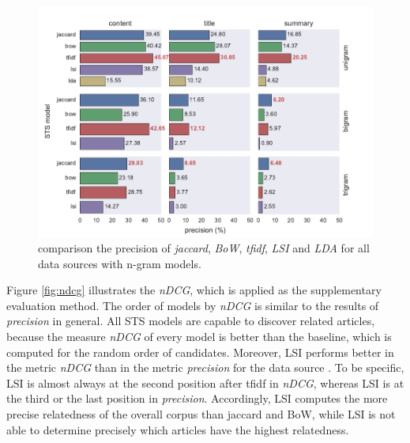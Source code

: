 \begin{figure}[!htb]
    \centering
    \includegraphics[width=\textwidth]{fig/precision_2_3}
    \caption{comparison the precision of \textit{jaccard}, \textit{BoW}, \textit{tfidf}, \textit{LSI} and \textit{LDA} for all data sources  with n-gram models. }
    \label{fig:precision_2_3}
\end{figure}

Figure \ref{fig:ndcg} illustrates the \textit{nDCG}, which is applied as the supplementary evaluation method. The order of models by \textit{nDCG} is similar to the results of \textit{precision} in general. All STS models are capable to discover related articles, because the measure \textit{nDCG} of every model is better than the baseline, which is computed for the random order of candidates. Moreover, LSI performs better in the metric \textit{nDCG} than in the metric \textit{precision} for the data source \icontent{}. To be specific, LSI is almost always at the second position after tfidf in \textit{nDCG}, whereas LSI is at the third or the last position in \textit{precision}. Accordingly, LSI computes the more precise relatedness of the overall corpus than jaccard and BoW, while LSI is not able to determine precisely which articles have the highest relatedness. 


